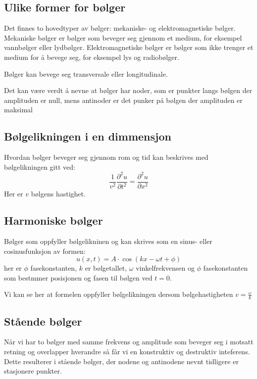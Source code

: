\homeworkProblem{}
\subsection*{Ulike former for bølger}

Det finnes to hovedtyper av bølger: mekaniske- og elektromagnetiske bølger. Mekaniske bølger er bølger som beveger seg gjennom et medium, for eksempel vannbølger eller lydbølger. Elektromagnetiske bølger er bølger som ikke trenger et medium for å bevege seg, for eksempel lys og radiobølger.

Bølger kan bevege seg transversale eller longitudinale.

Det kan være verdt å nevne at bølger har noder, som er punkter langs bølgen der amplituden er null, mens antinoder er det punker på bølgen der amplituden er maksimal

\subsection*{Bølgelikningen i en dimmensjon}

Hvordan bølger beveger seg gjennom rom og tid kan beskrives med bølgelikningen gitt ved:
\begin{equation*}
    \frac{1}{v^2}\frac{\partial^2 u}{\partial t^2}=\frac{\partial^2 u}{\partial x^2}
\end{equation*}
Her er $v$ bølgens hastighet.

\subsection*{Harmoniske bølger}

Bølger som oppfyller bølgelikninen og kan skrives som en sinus- eller cosinusfunksjon av formen:
\begin{equation*}
    u(x,t)=A\cdot \cos (kx-\omega t + \phi) 
\end{equation*}
her er $\phi$ fasekonstanten, $k$ er bølgetallet, $\omega$ vinkelfrekvensen og $\phi$ fasekonstanten som bestmmer posisjonen og fasen til bølgen ved $t=0$.

Vi kan se her at formelen oppfyller bølgelikningen dersom bølgehastigheten $v=\frac{\omega}{k}$

\subsection*{Stående bølger}
Når vi har to bølger med samme frekvens og amplitude som beveger seg i motsatt retning og overlapper hverandre så får vi en konstruktiv og destruktiv inteferens. Dette resulterer i stående bølger, der nodene og antinodene nevnt tidligere er stasjonere punkter.


